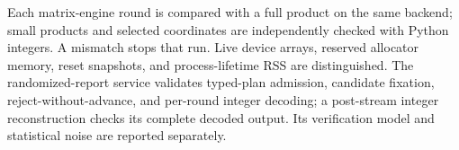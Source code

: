 Each matrix-engine round is compared with a full product on the same
backend; small products and selected coordinates are independently
checked with Python integers. A mismatch stops that run. Live device arrays,
reserved allocator memory, reset snapshots, and process-lifetime RSS
are distinguished. The randomized-report service validates typed-plan
admission, candidate fixation, reject-without-advance, and per-round
integer decoding; a post-stream integer reconstruction checks its complete
decoded output. Its verification model and statistical
noise are reported separately.
